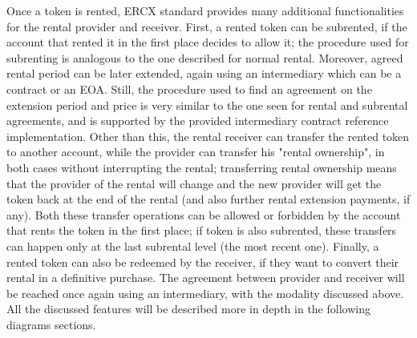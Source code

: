 \documentclass[english, LaM, oneside]{sapthesis}%
\begin{document}
Once a token is rented, ERCX standard provides many additional functionalities for the rental provider and receiver. First, a rented token can be subrented, if the account that rented it in the first place decides to allow it; the procedure used for subrenting is analogous to the one described for normal rental. \newline
Moreover, agreed rental period can be later extended, again using an intermediary which can be a contract or an EOA. Still, the procedure used to find an agreement on the extension period and price is very similar to the one seen for rental and subrental agreements, and is supported by the provided intermediary contract reference implementation. \newline
Other than this, the rental receiver can transfer the rented token to another account, while the provider can transfer his "rental ownership", in both cases without interrupting the rental; transferring rental ownership means that the provider of the rental will change and the new provider will get the token back at the end of the rental (and also further rental extension payments, if any). Both these transfer operations can be allowed or forbidden by the account that rents the token in the first place; if token is also subrented, these transfers can happen only at the last subrental level (the most recent one). \newline
Finally, a rented token can also be redeemed by the receiver, if they want to convert their rental in a definitive purchase. The agreement between provider and receiver will be reached once again using an intermediary, with the modality discussed above. \newline
All the discussed features will be described more in depth in the following diagrams sections.
\end{document}

